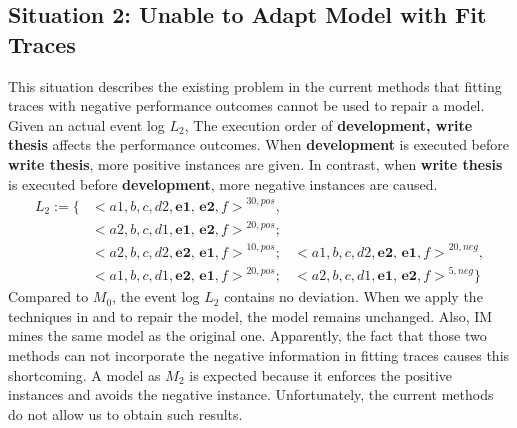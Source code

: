 \subsection{Situation 2: \small{Unable to Adapt Model with Fit Traces}}
This situation describes the existing problem in the current methods that fitting traces with negative performance outcomes cannot be used to repair a model. Given an actual event log $L_2$, The execution order of \textbf{development, write thesis} affects the performance outcomes. When \textbf{development} is executed before \textbf{write thesis}, more positive instances are given. In contrast, when \textbf{write thesis} is executed before \textbf{development}, more negative instances are caused. 
\begin{align*}
L_2:=\{ & { < a1, b, c, d2, \textbf{e1, e2}, f>}^{30, pos} , \\   
&{< a2, b, c, d1, \textbf{e1, e2}, f>}^{20, pos};   \\
&{< a2, b, c, d2, \textbf{e2, e1}, f>}^{10, pos}; 
& {< a1, b, c, d2, \textbf{e2, e1}, f>}^{20, neg} , \\
&{< a1, b, c, d1, \textbf{e2, e1}, f>}^{20, pos}; 
& {<a2, b, c, d1, \textbf{e1, e2}, f>}^{5, neg}  \}
\end{align*}
Compared to $M_0$, the event log $L_2$ contains no deviation. When we apply the techniques in  \cite{fahland2015model} and  \cite{dees2017enhancing} to repair the model, the model remains unchanged. Also, IM mines the same model as the original one. Apparently, the fact that those two methods can not incorporate the negative information in fitting traces causes this shortcoming. A model as $M_2$ is expected because it enforces the positive instances and avoids the negative instance. Unfortunately, the current methods do not allow us to obtain such results. 
